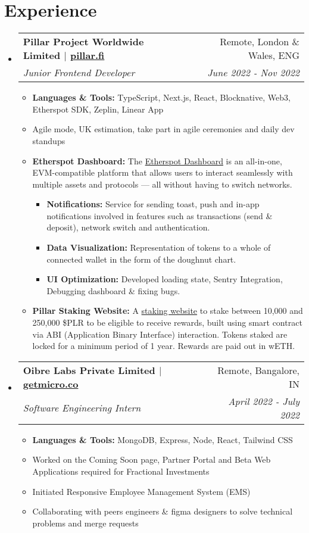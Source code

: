 \documentclass[letterpaper,11pt]{article}
\makeatletter
\newcommand{\resumeItem}[2]{
  \item\small{
    \textbf{#1}{#2 \vspace{-2pt}}
  }
}
\newcommand{\resumeSubHeading}[4]{
  \vspace{-1pt}\item
    \begin{tabular*}{0.97\textwidth}{l@{\extracolsep{\fill}}r}
      \textbf{#1} & #2 \\
      \textit{\small#3} & \textit{\small #4} \\
    \end{tabular*}\vspace{-5pt}
}
\newcommand{\resumeSubHeadingListStart}{\begin{itemize}[leftmargin=*]}
\newcommand{\resumeSubHeadingListEnd}{\end{itemize}}
\newcommand{\resumeItemListStart}{\begin{itemize}}
\newcommand{\resumeItemListEnd}{\end{itemize}\vspace{-5pt}}
\makeatother
\begin{document}
\section{Experience}
\resumeSubHeadingListStart
\resumeSubHeading
{Pillar Project Worldwide Limited $|$ \href{https://pillar.fi}{pillar.fi}}{Remote, London \& Wales, ENG}
{Junior Frontend Developer}{June 2022 - Nov 2022}
\resumeItemListStart
\resumeItem{Languages \& Tools: }{TypeScript, Next.js, React, Blocknative, Web3, Etherspot SDK, Zeplin, Linear App}
\resumeItem{}
{Agile mode, UK estimation, take part in agile ceremonies and daily dev standups}
\resumeItem{Etherspot Dashboard: }{The \href{https://develop.etherspot.io}{Etherspot Dashboard} is an all-in-one, EVM-compatible platform that allows users to interact seamlessly with multiple assets and protocols — all without having to switch networks.}
\resumeItemListStart
\resumeItem{Notifications: }
{Service for sending toast, push and in-app notifications involved in features such as transactions (send \& deposit), network switch and authentication.}
\vspace{1.2pt}
\resumeItem{Data Visualization: }
{Representation of tokens to a whole of connected wallet in the form of the doughnut chart.}
\resumeItem{UI Optimization: }
{Developed loading state, Sentry Integration, Debugging dashboard \& fixing bugs.}
\resumeItemListEnd
\vspace{5pt}
\resumeItem{Pillar Staking Website: }{A \href{https://ui-modifications.pillar-staking-frontend.pages.dev/}{staking website} to stake between 10,000 and 250,000 \$PLR to be eligible to receive rewards, built using smart contract via ABI (Application Binary Interface) interaction. Tokens staked are locked for a minimum period of 1 year. Rewards are paid out in wETH.}
\vspace{3pt}
\resumeItemListEnd

\resumeSubHeading
{Oibre Labs Private Limited $|$ \href{https://getmicro.co}{getmicro.co}}{Remote, Bangalore, IN}
{Software Engineering Intern}{April 2022 - July 2022}
\resumeItemListStart
\resumeItem{Languages \& Tools: }{MongoDB, Express, Node, React, Tailwind CSS}
\resumeItem{}
{Worked on the Coming Soon page, Partner Portal and Beta Web Applications required for Fractional Investments}
\resumeItem{}
{Initiated Responsive Employee Management System (EMS)}
\resumeItem{}
{Collaborating with peers engineers \& figma designers to solve technical problems and merge requests}
\resumeItemListEnd

\resumeSubHeadingListEnd
\end{document}
